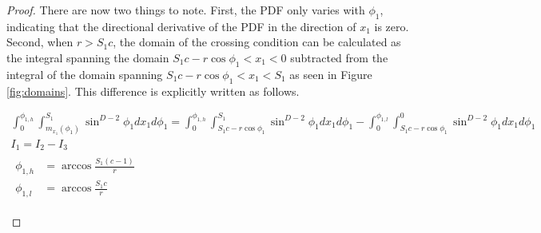 \documentclass{article}
\begin{document}
\begin{proof}
	There are now two things to note. First, the PDF only varies with $\phi_1$, indicating that the directional
	derivative of the PDF in the direction of $x_1$ is zero. Second, when $r>S_1c$, the domain of the crossing condition
	can be calculated as the integral spanning the domain $S_1c-r\cos\phi_1<x_1<0$ subtracted from the integral of
	the domain spanning $S_1c-r\cos\phi_1<x_1<S_1$ as seen in Figure \ref{fig:domains}. This difference is explicitly
	written as follows.

	\begin{gather}
		\int_0^{\phi_{1,h}}\int_{m_{x_1}(\phi_1)}^{S_1}\sin^{D-2}\phi_1dx_1d\phi_1 = \int_0^{\phi_{1,h}}\int_{S_1c-r\cos\phi_1}^{S_1}\sin^{D-2}\phi_1dx_1d\phi_1 - \int_0^{\phi_{1,l}}\int_{S_1c-r\cos\phi_1}^0\sin^{D-2}\phi_1dx_1d\phi_1 \\
		I_1 = I_2 - I_3 \\
		\begin{align}
			\phi_{1,h} &= \arccos\frac{S_1(c-1)}{r} \\
			\phi_{1,l} &= \arccos\frac{S_1c}{r}
		\end{align}
	\end{gather}

	\begin{figure}
		\centering
		\begin{subfigure}{0.45\textwidth}
			\centering
\end{subfigure}
\end{figure}
\end{proof}
\end{document}
